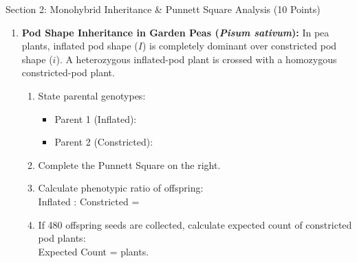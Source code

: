 \documentclass[10pt,a4paper]{scrartcl}
\begin{document}
\begin{sectionbox}{Section 2: Monohybrid Inheritance \& Punnett Square Analysis (10 Points)}
\begin{enumerate}
  \item \textbf{Pod Shape Inheritance in Garden Peas (\textit{Pisum sativum}):}
  In pea plants, inflated pod shape ($I$) is completely dominant over constricted pod shape ($i$). A heterozygous inflated-pod plant is crossed with a homozygous constricted-pod plant.

  \vspace{1pt}
  \begin{minipage}[t]{0.56\textwidth}
    \begin{enumerate}
      \item State parental genotypes:
      \begin{itemize}[label={--}, leftmargin=10pt, itemsep=0pt]
        \item Parent 1 (Inflated): \underline{\hspace{1.5cm}}
        \item Parent 2 (Constricted): \underline{\hspace{1.4cm}}
      \end{itemize}
      \item Complete the Punnett Square on the right.
      \item Calculate phenotypic ratio of offspring:\\
      Inflated : Constricted = \underline{\hspace{1.5cm}}
      \item If 480 offspring seeds are collected, calculate expected count of constricted pod plants:\\
      Expected Count = \underline{\hspace{1.5cm}} plants.
    \end{enumerate}
  \end{minipage}%
  \hfill
  \begin{minipage}[t]{0.40\textwidth}
    \centering
    \begin{tcolorbox}[colback=white, colframe=TealMedium, boxrule=0.8pt, title={\centering\small\sffamily\bfseries Monohybrid Cross Punnett Square}, coltitle=white, width=\linewidth, top=1pt, bottom=1pt]
      \centering
      \vspace{1pt}
\end{tcolorbox}
\end{minipage}
\end{enumerate}
\end{sectionbox}
\end{document}
